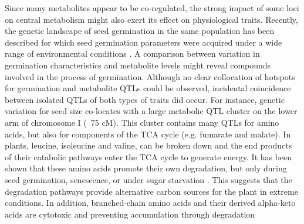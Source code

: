 Since many metabolites appear to be co-regulated, the strong impact of some loci on central metabolism might 
also exert its effect on physiological traits. Recently, the genetic landscape of seed germination in the 
same population has been described for which seed germination parameters were acquired under a wide range 
of environmental conditions \cite{Joosen:2011}. A comparison between variation in germination characteristics 
and metabolite levels might reveal compounds involved in the process of germination. Although no clear 
collocation of hotspots for germination and metabolite QTLs could be observed, incidental coincidence between 
isolated QTLs of both types of traits did occur. For instance, genetic variation for seed size co-locates 
with a large metabolic QTL cluster on the lower arm of chromosome I (~75 cM). This cluster contains many QTLs 
for amino acids, but also for components of the TCA cycle (e.g. fumarate and malate). In plants, leucine, 
isoleucine and valine, can be broken down and the end products of their catabolic pathways enter the TCA cycle 
to generate energy. It has been shown that these amino acids promote their own degradation, but only during 
seed germination, senescence, or under sugar starvation \cite{Binder:2010}. This suggests that the degradation 
pathways provide alternative carbon sources for the plant in extreme conditions. In addition, branched-chain 
amino acids and their derived alpha-keto acids are cytotoxic and preventing accumulation through degradation 

